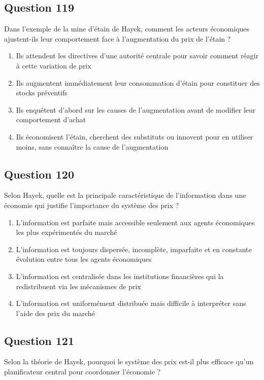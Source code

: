 \documentclass[12pt,a4paper]{article}
\begin{document}
\bigskip


\subsection*{Question 119}
Dans l'exemple de la mine d'étain de Hayek, comment les acteurs économiques ajustent-ils leur comportement face à l'augmentation du prix de l'étain ?

\begin{enumerate}[label=\Alph*., leftmargin=*]
\item Ils attendent les directives d'une autorité centrale pour savoir comment réagir à cette variation de prix
\item Ils augmentent immédiatement leur consommation d'étain pour constituer des stocks préventifs
\item Ils enquêtent d'abord sur les causes de l'augmentation avant de modifier leur comportement d'achat
\item Ils économisent l'étain, cherchent des substituts ou innovent pour en utiliser moins, sans connaître la cause de l'augmentation
\end{enumerate}

\bigskip


\subsection*{Question 120}
Selon Hayek, quelle est la principale caractéristique de l'information dans une économie qui justifie l'importance du système des prix ?

\begin{enumerate}[label=\Alph*., leftmargin=*]
\item L'information est parfaite mais accessible seulement aux agents économiques les plus expérimentés du marché
\item L'information est toujours dispersée, incomplète, imparfaite et en constante évolution entre tous les agents économiques
\item L'information est centralisée dans les institutions financières qui la redistribuent via les mécanismes de prix
\item L'information est uniformément distribuée mais difficile à interpréter sans l'aide des prix du marché
\end{enumerate}

\bigskip


\subsection*{Question 121}
Selon la théorie de Hayek, pourquoi le système des prix est-il plus efficace qu'un planificateur central pour coordonner l'économie ?
\end{document}
